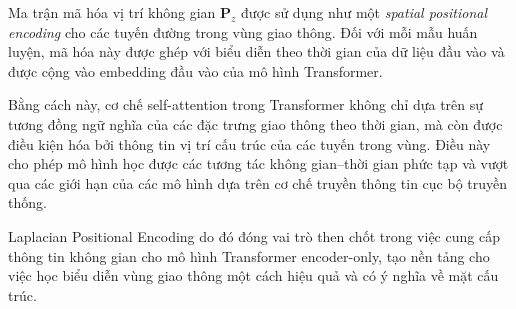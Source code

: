 Ma trận mã hóa vị trí không gian $\mathbf{P}_z$ được sử dụng như một \textit{spatial
positional encoding} cho các tuyến đường trong vùng giao thông. Đối với mỗi mẫu huấn
luyện, mã hóa này được ghép với biểu diễn theo thời gian của dữ liệu đầu vào và được cộng
vào embedding đầu vào của mô hình Transformer.

Bằng cách này, cơ chế self-attention trong Transformer không chỉ dựa trên sự tương đồng
ngữ nghĩa của các đặc trưng giao thông theo thời gian, mà còn được điều kiện hóa bởi thông
tin vị trí cấu trúc của các tuyến trong vùng. Điều này cho phép mô hình học được các tương
tác không gian--thời gian phức tạp và vượt qua các giới hạn của các mô hình dựa trên cơ chế
truyền thông tin cục bộ truyền thống.

Laplacian Positional Encoding do đó đóng vai trò then chốt trong việc cung cấp thông tin
không gian cho mô hình Transformer encoder-only, tạo nền tảng cho việc học biểu diễn
vùng giao thông một cách hiệu quả và có ý nghĩa về mặt cấu trúc.
